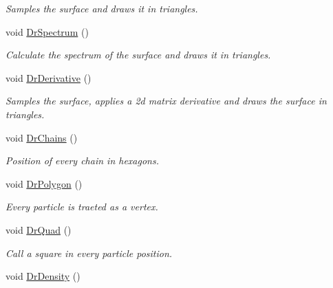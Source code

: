 \begin{DoxyCompactItemize}
\begin{DoxyCompactList}\small\item\em \-Samples the surface and draws it in triangles. \end{DoxyCompactList}\item 
\hypertarget{classElPoly_a487c5fd53a9d6527b47cfd003422be58}{void \hyperlink{classElPoly_a487c5fd53a9d6527b47cfd003422be58}{\-Dr\-Spectrum} ()}\label{classElPoly_a487c5fd53a9d6527b47cfd003422be58}

\begin{DoxyCompactList}\small\item\em \-Calculate the spectrum of the surface and draws it in triangles. \end{DoxyCompactList}\item 
\hypertarget{classElPoly_aaafb3fae855c37686197d2d1f66cea4c}{void \hyperlink{classElPoly_aaafb3fae855c37686197d2d1f66cea4c}{\-Dr\-Derivative} ()}\label{classElPoly_aaafb3fae855c37686197d2d1f66cea4c}

\begin{DoxyCompactList}\small\item\em \-Samples the surface, applies a 2d matrix derivative and draws the surface in triangles. \end{DoxyCompactList}\item 
\hypertarget{classElPoly_aee4f14af2142abdfefdb0b0cd7ac6db3}{void \hyperlink{classElPoly_aee4f14af2142abdfefdb0b0cd7ac6db3}{\-Dr\-Chains} ()}\label{classElPoly_aee4f14af2142abdfefdb0b0cd7ac6db3}

\begin{DoxyCompactList}\small\item\em \-Position of every chain in hexagons. \end{DoxyCompactList}\item 
\hypertarget{classElPoly_a214894e61823ee214875334b23fa69c2}{void \hyperlink{classElPoly_a214894e61823ee214875334b23fa69c2}{\-Dr\-Polygon} ()}\label{classElPoly_a214894e61823ee214875334b23fa69c2}

\begin{DoxyCompactList}\small\item\em \-Every particle is traeted as a vertex. \end{DoxyCompactList}\item 
\hypertarget{classElPoly_a626c51b506cf13c725c26652f9a25926}{void \hyperlink{classElPoly_a626c51b506cf13c725c26652f9a25926}{\-Dr\-Quad} ()}\label{classElPoly_a626c51b506cf13c725c26652f9a25926}

\begin{DoxyCompactList}\small\item\em \-Call a square in every particle position. \end{DoxyCompactList}\item 
\hypertarget{classElPoly_a04dd5a15e1151a49baece8c9196ca614}{void \hyperlink{classElPoly_a04dd5a15e1151a49baece8c9196ca614}{\-Dr\-Density} ()}\label{classElPoly_a04dd5a15e1151a49baece8c9196ca614}


\end{DoxyCompactItemize}
